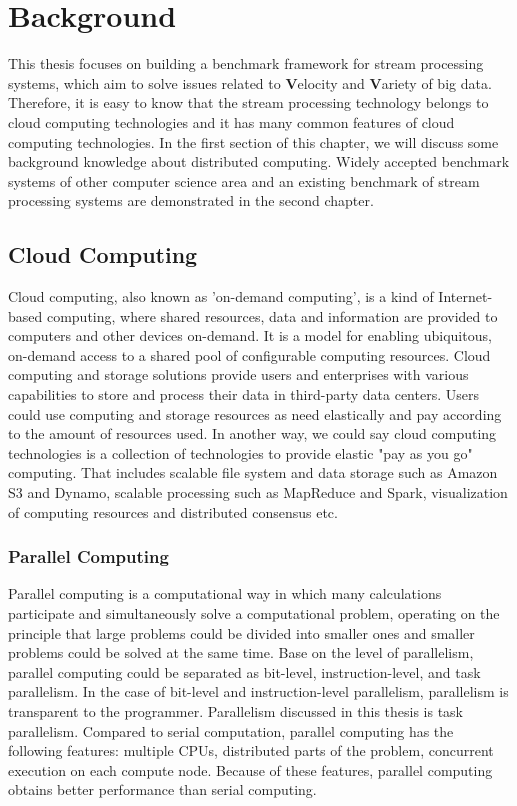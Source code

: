 \chapter{Background}
This thesis focuses on building a benchmark framework for stream processing systems, which aim to solve issues related to \textbf{V}elocity and \textbf{V}ariety of big data. \cite{GameChanger} Therefore, it is easy to know that the stream processing technology belongs to cloud computing technologies and it has many common features of cloud computing technologies. In the first section of this chapter, we will discuss some background knowledge about distributed computing.   Widely accepted benchmark systems of other computer science area and an existing benchmark of stream processing systems are demonstrated in the second chapter. 

\section{Cloud Computing}
Cloud computing, also known as 'on-demand computing', is a kind of Internet-based computing, where shared resources, data and information are provided to computers and other devices on-demand. It is a model for enabling ubiquitous, on-demand access to a shared pool of configurable computing resources. \cite{neto2011demystifying, mell2011nist} Cloud computing and storage solutions provide users and enterprises with various capabilities to store and process their data in third-party data centers. \cite{haghighat2015cloudid} Users could use computing and storage resources as need elastically and pay according to the amount of resources used. In another way, we could say cloud computing technologies is a collection of technologies to provide elastic "pay as you go" computing. That includes scalable file system and data storage such as Amazon S3 and Dynamo, scalable processing such as MapReduce and Spark, visualization of computing resources and distributed consensus etc. 

\subsection{Parallel Computing}

Parallel computing is a computational way in which many calculations participate and simultaneously solve a computational problem, operating on the principle that large problems could be divided into smaller ones and smaller problems could be solved at the same time. Base on the level of parallelism, parallel computing could be separated as bit-level, instruction-level,  and task parallelism. In the case of bit-level and instruction-level parallelism, parallelism is transparent to the programmer. Parallelism discussed in this thesis is task parallelism. Compared to serial computation, parallel computing has the following features: multiple CPUs, distributed parts of the problem, concurrent execution on each compute node. Because of these features, parallel computing obtains better performance than serial computing. 

